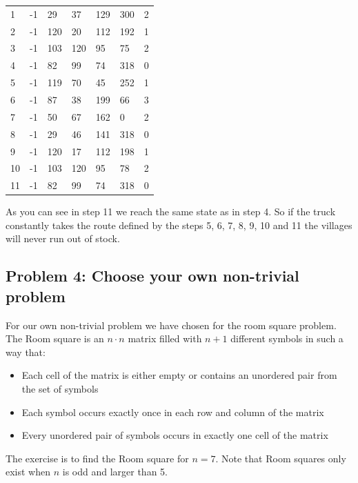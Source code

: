 \documentclass[12pt]{article}
\begin{document}
{\begin{center}
\begin{tabular}{| l | l | l | l | l | l | l |}
1	& 	-1	&	29	&	37	&	129	&	300	&	2	\\
2	& 	-1	&	120	&	20 	&	112	&	192	&	1	\\
3	& 	-1	&	103	&	120 	&	95	&	75	&	2	\\
4	& 	-1	&	82	&	99	&	74	&	318	&	0	\\
5	& 	-1	&	119	&	70	&	45	&	252	&	1	\\
6	& 	-1	&	87	&	38 	&	199 	&	66	&	3	\\
7	& 	-1	&	50	&	67 	&	162	&	0	&	2	\\
8	& 	-1	&	29	&	46 	&	141	&	318	&	0	\\
9	& 	-1	&	120	&	17 	&	112	&	198	&	1	\\
10	& 	-1	&	103	&	120 	&	95	&	78	&	2	\\
11	& 	-1	&	82	&	99	&	74	&	318	&	0	\\
\hline
\end{tabular}
\end{center}
\vspace{3mm}
\noindent As you can see in step 11 we reach the same state as in step 4. So if the truck constantly takes the route defined by the steps 5, 6, 7, 8, 9, 10 and 11 the villages will never run out of stock.
\vspace{3mm}

\subsection*{Problem 4: Choose your own non-trivial problem}

For our own non-trivial problem we have chosen for the room square problem. The Room square is an $n \cdot n$ matrix filled with $n+1$ different symbols in such a way that:\\
\begin{itemize}
\item Each cell of the matrix is either empty or contains an unordered pair from the set of symbols
\item Each symbol occurs exactly once in each row and column of the matrix
\item Every unordered pair of symbols occurs in exactly one cell of the matrix
\end{itemize}
The exercise is to find the Room square for $n = 7$. Note that Room squares only exist when $n$ is odd and larger than 5.
\vspace{8mm}

}
\end{document}
